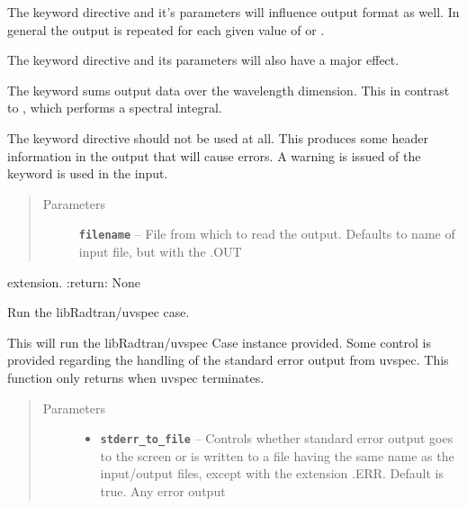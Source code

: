 \documentclass[a4paper,10pt,english]{sphinxmanual}
\begin{document}
\begin{fulllineitems}
\begin{fulllineitems}
The keyword directive  and it's parameters will influence output format as well. In general the output
is repeated for each given value of  or .

The keyword directive  and its parameters will also have a major effect.

The  keyword sums output data over the wavelength dimension. This in contrast to ,
which performs a spectral integral.

The keyword directive  should not be used at all. This produces some header information in the output
that will cause errors. A warning is issued of the  keyword is used in the input.
\begin{quote}\begin{description}
\item[{Parameters}] \leavevmode
\textbf{\texttt{filename}} -- File from which to read the output. Defaults to name of input file, but with the .OUT

\end{description}\end{quote}

extension.
:return: None

\end{fulllineitems}


\begin{fulllineitems}
\label{packages:librad.Case.run}
Run the libRadtran/uvspec case.

This will run the libRadtran/uvspec Case instance provided. Some control is provided regarding the handling of
the standard error output from uvspec. This function only returns when uvspec terminates.
\begin{quote}\begin{description}
\item[{Parameters}] \leavevmode\begin{itemize}
\item {} 
\textbf{\texttt{stderr\_to\_file}} -- Controls whether standard error output goes to the screen or is written to a file
having the same name as the input/output files, except with the extension .ERR. Default is true.
Any error output


\end{itemize}
\end{description}
\end{quote}
\end{fulllineitems}
\end{fulllineitems}
\end{document}
